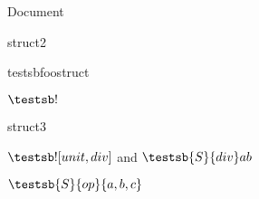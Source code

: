 \documentclass[debug=all]{stex}
\begin{document}
\noindent Document \printdocument

\begin{smodule}{struct2}

  \begin{extstructure}{testsb}{foostruct}
  \end{extstructure}

  $\testsb!$

\end{smodule}

\begin{smodule}{struct3}


  $\testsb![unit,div]$ and $\testsb{S}{div}ab$

  $\testsb{S}{op}{a,b,c}$

\end{smodule}
\end{document}
